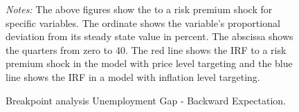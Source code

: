 \documentclass[11pt, a4paper, leqno]{article}
\begin{document}
\begin{figure}[ht!]
	\caption{Breakpoint analysis Unemployment Gap - Backward Expectation.}
	\label{fig:irf}
	\centering
    	\bigskip
	\begin{minipage}{\textwidth}%
		\footnotesize\setlength{\baselineskip}{11pt}%
		\bigskip \textit{Notes:} The above figures show the  to a risk premium shock for specific variables. The ordinate shows the variable's proportional deviation from its steady state value in percent. The abscissa shows the quarters from zero to 40. The red line shows the IRF to a risk premium shock in the model with price level targeting and the blue line shows the IRF in a model with inflation level targeting.
	\end{minipage}
\end{figure}
\end{document}
